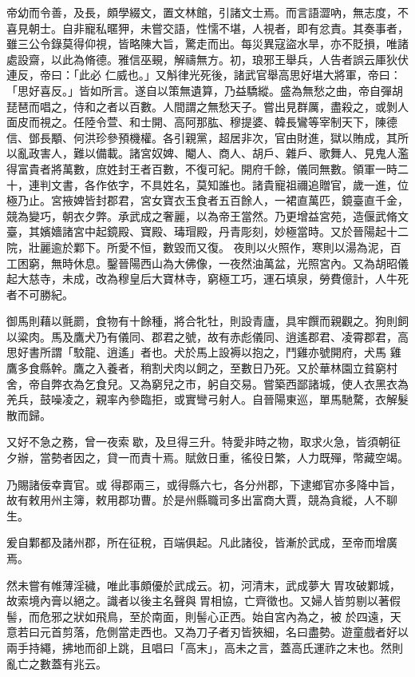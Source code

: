 \begin{pinyinscope}
 帝幼而令善，及長，頗學綴文，置文林館，引諸文士焉。而言語澀吶，無志度，不喜見朝士。自非寵私暱狎，未嘗交語，性懦不堪，人視者，即有忿責。其奏事者，雖三公令錄莫得仰視，皆略陳大旨，驚走而出。每災異寇盜水旱，亦不貶損，唯諸處設齋，以此為脩德。雅信巫覡，解禱無方。初，琅邪王舉兵，人告者誤云厙狄伏連反，帝曰：「此必
 仁威也。」又斛律光死後，諸武官舉高思好堪大將軍，帝曰：「思好喜反。」皆如所言。遂自以策無遺算，乃益驕縱。盛為無愁之曲，帝自彈胡琵琶而唱之，侍和之者以百數。人間謂之無愁天子。嘗出見群厲，盡殺之，或剝人面皮而視之。任陸令萱、和士開、高阿那肱、穆提婆、韓長鸞等宰制天下，陳德信、鄧長顒、何洪珍參預機權。各引親黨，超居非次，官由財進，獄以賄成，其所以亂政害人，難以備載。諸宮奴婢、閹人、商人、胡戶、雜戶、歌舞人、見鬼人濫
 得富貴者將萬數，庶姓封王者百數，不復可紀。開府千餘，儀同無數。領軍一時二十，連判文書，各作依字，不具姓名，莫知誰也。諸貴寵祖禰追贈官，歲一進，位極乃止。宮掖婢皆封郡君，宮女寶衣玉食者五百餘人，一裙直萬匹，鏡臺直千金，競為變巧，朝衣夕弊。承武成之奢麗，以為帝王當然。乃更增益宮苑，造偃武脩文臺，其嬪嬙諸宮中起鏡殿、寶殿、瑇瑁殿，丹青彫刻，妙極當時。又於晉陽起十二院，壯麗逾於鄴下。所愛不恒，數毀而又復。
 夜則以火照作，寒則以湯為泥，百工困窮，無時休息。鑿晉陽西山為大佛像，一夜然油萬盆，光照宮內。又為胡昭儀起大慈寺，未成，改為穆皇后大寶林寺，窮極工巧，運石填泉，勞費億計，人牛死者不可勝紀。



 御馬則藉以氈罽，食物有十餘種，將合牝牡，則設青廬，具牢饌而親觀之。狗則飼以粱肉。馬及鷹犬乃有儀同、郡君之號，故有赤彪儀同、逍遙郡君、凌霄郡君，高思好書所謂「駮龍、逍遙」者也。犬於馬上設褥以抱之，鬥雞亦號開府，犬馬
 雞鷹多食縣幹。鷹之入養者，稍割犬肉以飼之，至數日乃死。又於華林園立貧窮村舍，帝自弊衣為乞食兒。又為窮兒之市，躬自交易。嘗築西鄙諸城，使人衣黑衣為羌兵，鼓噪凌之，親率內參臨拒，或實彎弓射人。自晉陽東巡，單馬馳騖，衣解髮散而歸。



 又好不急之務，曾一夜索歇，及旦得三升。特愛非時之物，取求火急，皆須朝征夕辦，當勢者因之，貸一而責十焉。賦斂日重，徭役日繁，人力既殫，幣藏空竭。



 乃賜諸佞幸賣官。或
 得郡兩三，或得縣六七，各分州郡，下逮鄉官亦多降中旨，故有敕用州主簿，敕用郡功曹。於是州縣職司多出富商大賈，競為貪縱，人不聊生。



 爰自鄴都及諸州郡，所在征稅，百端俱起。凡此諸役，皆漸於武成，至帝而增廣焉。



 然未嘗有帷薄淫穢，唯此事頗優於武成云。初，河清末，武成夢大胃攻破鄴城，故索境內膏以絕之。識者以後主名聲與胃相協，亡齊徵也。又婦人皆剪剔以著假髻，而危邪之狀如飛鳥，至於南面，則髻心正西。始自宮內為之，被
 於四遠，天意若曰元首剪落，危側當走西也。又為刀子者刃皆狹細，名曰盡勢。遊童戲者好以兩手持繩，拂地而卻上跳，且唱曰「高末」，高未之言，蓋高氏運祚之末也。然則亂亡之數蓋有兆云。




\end{pinyinscope}
